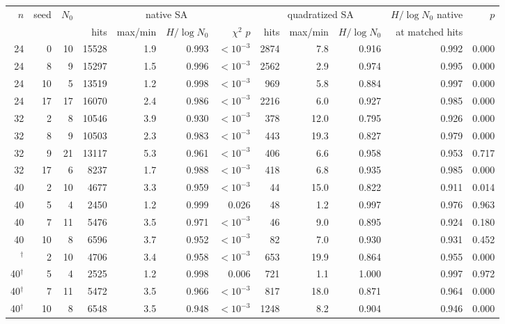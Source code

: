 \begin{tabular}{rrr rrrr rrr rr}
\toprule
$n$ & seed & $N_0$ & \multicolumn{4}{c}{native SA} & \multicolumn{3}{c}{quadratized SA} & $H/\log N_0$ native & $p$ \\
& & & hits & max/min & $H/\log N_0$ & $\chi^2$ $p$ & hits & max/min & $H/\log N_0$ & at matched hits & \\
\midrule
24 & 0 & 10 & 15528 & 1.9 & 0.993 & $<10^{-3}$ & 2874 & 7.8 & 0.916 & 0.992 & 0.000 \\
24 & 8 & 9 & 15297 & 1.5 & 0.996 & $<10^{-3}$ & 2562 & 2.9 & 0.974 & 0.995 & 0.000 \\
24 & 10 & 5 & 13519 & 1.2 & 0.998 & $<10^{-3}$ & 969 & 5.8 & 0.884 & 0.997 & 0.000 \\
24 & 17 & 17 & 16070 & 2.4 & 0.986 & $<10^{-3}$ & 2216 & 6.0 & 0.927 & 0.985 & 0.000 \\
32 & 2 & 8 & 10546 & 3.9 & 0.930 & $<10^{-3}$ & 378 & 12.0 & 0.795 & 0.926 & 0.000 \\
32 & 8 & 9 & 10503 & 2.3 & 0.983 & $<10^{-3}$ & 443 & 19.3 & 0.827 & 0.979 & 0.000 \\
32 & 9 & 21 & 13117 & 5.3 & 0.961 & $<10^{-3}$ & 406 & 6.6 & 0.958 & 0.953 & 0.717 \\
32 & 17 & 6 & 8237 & 1.7 & 0.988 & $<10^{-3}$ & 418 & 6.8 & 0.935 & 0.985 & 0.000 \\
40 & 2 & 10 & 4677 & 3.3 & 0.959 & $<10^{-3}$ & 44 & 15.0 & 0.822 & 0.911 & 0.014 \\
40 & 5 & 4 & 2450 & 1.2 & 0.999 & 0.026 & 48 & 1.2 & 0.997 & 0.976 & 0.963 \\
40 & 7 & 11 & 5476 & 3.5 & 0.971 & $<10^{-3}$ & 46 & 9.0 & 0.895 & 0.924 & 0.180 \\
40 & 10 & 8 & 6596 & 3.7 & 0.952 & $<10^{-3}$ & 82 & 7.0 & 0.930 & 0.931 & 0.452 \\
\addlinespace[2pt]
40$^\dagger$ & 2 & 10 & 4706 & 3.4 & 0.958 & $<10^{-3}$ & 653 & 19.9 & 0.864 & 0.955 & 0.000 \\
40$^\dagger$ & 5 & 4 & 2525 & 1.2 & 0.998 & 0.006 & 721 & 1.1 & 1.000 & 0.997 & 0.972 \\
40$^\dagger$ & 7 & 11 & 5472 & 3.5 & 0.966 & $<10^{-3}$ & 817 & 18.0 & 0.871 & 0.964 & 0.000 \\
40$^\dagger$ & 10 & 8 & 6548 & 3.5 & 0.948 & $<10^{-3}$ & 1248 & 8.2 & 0.904 & 0.946 & 0.000 \\
\bottomrule
\end{tabular}